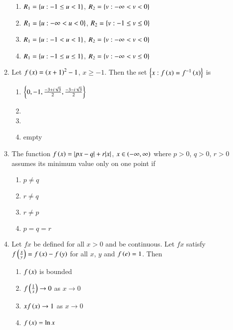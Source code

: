\documentclass[journal]{IEEEtran}
\begin{document}
\begin{enumerate}
\hfill{}

\begin{enumerate}
\item $R_1=\left\{u:-1\le u<1\right\}$, $R_2=\left\{v:-\infty<v<0\right\}$
\item $R_1=\left\{u:-\infty<u<0\right\}$, $R_2=\left\{v:-1\le v\le0\right\}$
\item $R_1=\left\{u:-1<u<1\right\}$, $R_2=\left\{v:-\infty<v<0\right\}$
\item $R_1=\left\{u:-1\le u\le1\right\}$, $R_2=\left\{v:-\infty<v\le0\right\}$
\end{enumerate}

\item Let $f\left(x\right)=\left(x+1\right)^{2}-1$, $x\ge-1$. Then the set $\left\{x:f\left(x\right)=f^{-1}\left(x\right)\right\}$ is

\hfill{}

\begin{enumerate}
\item $\left\{0, -1, \frac{-3+i\sqrt{3}}{2}, \frac{-3-i\sqrt{3}}{2}\right\}$
\item {}
\item {}
\item empty
\end{enumerate}

\item The function $f\left(x\right)=|px-q|+r|x|$, $x\in\left(-\infty,\infty\right)$ where $p>0$, $q>0$, $r>0$ assumes its minimum value only on one point if

\hfill{}

\begin{multicols}{2}
	\begin{enumerate}
		\item $p\neq q$
		\item $r\neq q$
		\item $r\neq p$ 
		\item $p=q=r$
	\end{enumerate}
\end{multicols}

\item Let $f{x}$ be defined for all $x>0$ and be continuous. Let $f{x}$ satisfy $f\left(\frac{x}{y}\right)=f\left(x\right)-f\left(y\right)$ for all $x$, $y$ and $f\left(e\right)=1$. Then

\hfill{}

\begin{multicols}{2}
	\begin{enumerate}
		\item $f\left(x\right)$ is bounded 
		\item $f\left(\frac{1}{x}\right)\to0$ as $x\to0$
		\item $xf\left(x\right)\to1$ as $x\to0$ 
		\item $f\left(x\right)=\ln{x}$
	\end{enumerate}
\end{multicols}


\end{enumerate}
\end{document}
